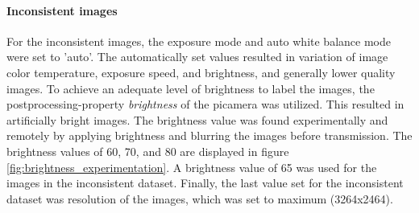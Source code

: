 \paragraph{Inconsistent images}
For the inconsistent images, the exposure mode and auto white balance mode were set to 'auto'. The automatically set values resulted in variation of image color temperature, exposure speed, and brightness, and generally lower quality images. To achieve an adequate level of brightness to label the images, the postprocessing-property \textit{brightness} of the picamera was utilized. This resulted in artificially bright images. The brightness value was found experimentally and remotely by applying brightness and blurring the images before transmission. The brightness values of 60, 70, and 80 are displayed in figure \ref{fig:brightness_experimentation}. A brightness value of 65 was used for the images in the inconsistent dataset. Finally, the last value set for the inconsistent dataset was resolution of the images, which was set to maximum (3264x2464).


